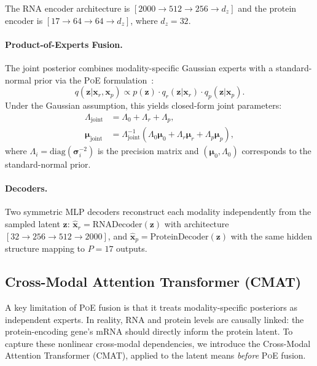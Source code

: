 \documentclass[11pt,a4paper]{article}
\newcommand{\cmat}{\textsc{CMAT}}
\newcommand{\poe}{\textsc{PoE}}
\newcommand{\bx}{\mathbf{x}}
\newcommand{\bz}{\mathbf{z}}
\newcommand{\bmu}{\boldsymbol{\mu}}
\newcommand{\bsig}{\boldsymbol{\sigma}}
\begin{document}
The RNA encoder architecture is $[2000 \to 512 \to 256 \to d_z]$ and the protein encoder is $[17 \to 64 \to 64 \to d_z]$, where $d_z=32$.

\paragraph{Product-of-Experts Fusion.}
The joint posterior combines modality-specific Gaussian experts with a standard-normal prior via the \poe{} formulation~\citep{wu2018}:
\begin{equation}\label{eq:poe}
  q(\bz|\bx_r, \bx_p) \propto p(\bz)\cdot q_r(\bz|\bx_r)\cdot q_p(\bz|\bx_p).
\end{equation}
Under the Gaussian assumption, this yields closed-form joint parameters:
\begin{align}
  \Lambda_\text{joint} &= \Lambda_0 + \Lambda_r + \Lambda_p, \label{eq:poe_prec}\\
  \bmu_\text{joint} &= \Lambda_\text{joint}^{-1}(\Lambda_0\bmu_0 + \Lambda_r\bmu_r + \Lambda_p\bmu_p), \label{eq:poe_mu}
\end{align}
where $\Lambda_i = \text{diag}(\bsig_i^{-2})$ is the precision matrix and $(\bmu_0, \Lambda_0)$ corresponds to the standard-normal prior.

\paragraph{Decoders.}
Two symmetric MLP decoders reconstruct each modality independently from the sampled latent $\bz$:
$\hat{\bx}_r = \text{RNADecoder}(\bz)$ with architecture $[32 \to 256 \to 512 \to 2000]$, and $\hat{\bx}_p = \text{ProteinDecoder}(\bz)$ with the same hidden structure mapping to $P=17$ outputs.

\subsection{Cross-Modal Attention Transformer (CMAT)}\label{ssec:cmat}

A key limitation of \poe{} fusion is that it treats modality-specific posteriors as independent experts.
In reality, RNA and protein levels are causally linked: the protein-encoding gene's mRNA should directly inform the protein latent.
To capture these nonlinear cross-modal dependencies, we introduce the Cross-Modal Attention Transformer (\cmat), applied to the latent means \emph{before} \poe{} fusion.
\end{document}
